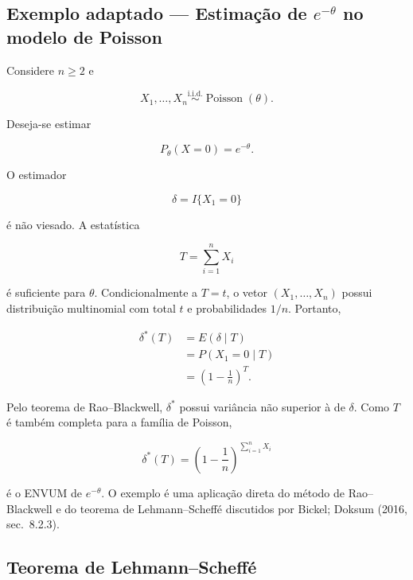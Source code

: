 \documentclass[
  letterpaper,
  DIV=11,
  numbers=noendperiod]{scrreprt}
\begin{document}
\subsection*{\texorpdfstring{Exemplo adaptado --- Estimação de
\(e^{-\theta}\) no modelo de
Poisson}{Exemplo adaptado --- Estimação de e\^{}\{-\textbackslash theta\} no modelo de Poisson}}\label{exemplo-adaptado-estimauxe7uxe3o-de-e-theta-no-modelo-de-poisson}

Considere \(n\geq2\) e

\[X_1,\ldots,X_n
\overset{\mathrm{i.i.d.}}{\sim}
\operatorname{Poisson}(\theta).\]

Deseja-se estimar

\[P_\theta(X=0)=e^{-\theta}.\]

O estimador

\[\delta=I\{X_1=0\}\]

é não viesado. A estatística

\[T=\sum_{i=1}^nX_i\]

é suficiente para \(\theta\). Condicionalmente a \(T=t\), o vetor
\((X_1,\ldots,X_n)\) possui distribuição multinomial com total \(t\) e
probabilidades \(1/n\). Portanto,

\[\begin{aligned}
\delta^*(T)
&=
E(\delta\mid T) \\
&=
P(X_1=0\mid T) \\
&=
\left(1-\frac{1}{n}\right)^T.
\end{aligned}\]

Pelo teorema de Rao--Blackwell, \(\delta^*\) possui variância não
superior à de \(\delta\). Como \(T\) é também completa para a família de
Poisson,

\[\boxed{
\delta^*(T)
=
\left(1-\frac{1}{n}\right)^{\sum_{i=1}^nX_i}
}\]

é o ENVUM de \(e^{-\theta}\). O exemplo é uma aplicação direta do método
de Rao--Blackwell e do teorema de Lehmann--Scheffé discutidos por
Bickel; Doksum (2016, sec.~8.2.3).

\subsection*{Teorema de
Lehmann--Scheffé}\label{teorema-de-lehmannscheffuxe9}
\end{document}
